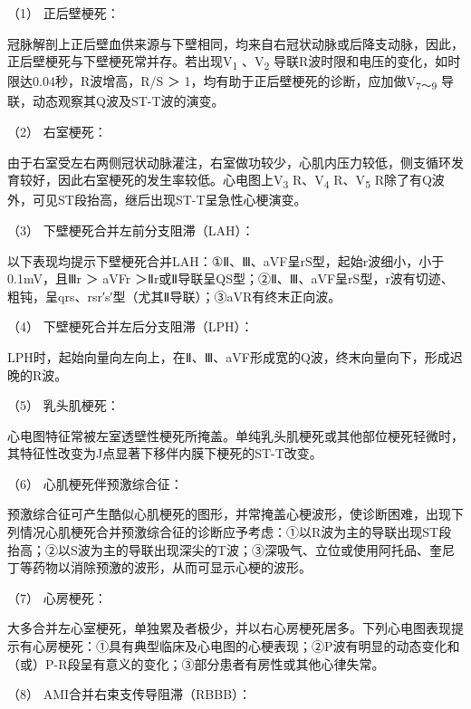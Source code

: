 \hypertarget{text00312.htmlux5cux23CHP10-8-2-2-2-1-4-1}{}
（1） 正后壁梗死：

冠脉解剖上正后壁血供来源与下壁相同，均来自右冠状动脉或后降支动脉，因此，正后壁梗死与下壁梗死常并存。若出现V\textsubscript{1}
、V\textsubscript{2}
导联R波时限和电压的变化，如时限达0.04秒，R波增高，R/S ＞
1，均有助于正后壁梗死的诊断，应加做V\textsubscript{7～9}
导联，动态观察其Q波及ST-T波的演变。

\hypertarget{text00312.htmlux5cux23CHP10-8-2-2-2-1-4-2}{}
（2） 右室梗死：

由于右室受左右两侧冠状动脉灌注，右室做功较少，心肌内压力较低，侧支循环发育较好，因此右室梗死的发生率较低。心电图上V\textsubscript{3}
R、V\textsubscript{4} R、V\textsubscript{5}
R除了有Q波外，可见ST段抬高，继后出现ST-T呈急性心梗演变。

\hypertarget{text00312.htmlux5cux23CHP10-8-2-2-2-1-4-3}{}
（3） 下壁梗死合并左前分支阻滞（LAH）：

以下表现均提示下壁梗死合并LAH：①Ⅱ、Ⅲ、aVF呈rS型，起始r波细小，小于0.1mV，且Ⅲr
＞ aVFr
＞Ⅱr或Ⅱ导联呈QS型；②Ⅱ、Ⅲ、aVF呈rS型，r波有切迹、粗钝，呈qrs、rsr′s′型（尤其Ⅱ导联）；③aVR有终末正向波。

\hypertarget{text00312.htmlux5cux23CHP10-8-2-2-2-1-4-4}{}
（4） 下壁梗死合并左后分支阻滞（LPH）：

LPH时，起始向量向左向上，在Ⅱ、Ⅲ、aVF形成宽的Q波，终末向量向下，形成迟晚的R波。

\hypertarget{text00312.htmlux5cux23CHP10-8-2-2-2-1-4-5}{}
（5） 乳头肌梗死：

心电图特征常被左室透壁性梗死所掩盖。单纯乳头肌梗死或其他部位梗死轻微时，其特征性改变为J点显著下移伴内膜下梗死的ST-T改变。

\hypertarget{text00312.htmlux5cux23CHP10-8-2-2-2-1-4-6}{}
（6） 心肌梗死伴预激综合征：

预激综合征可产生酷似心肌梗死的图形，并常掩盖心梗波形，使诊断困难，出现下列情况心肌梗死合并预激综合征的诊断应予考虑：①以R波为主的导联出现ST段抬高；②以S波为主的导联出现深尖的T波；③深吸气、立位或使用阿托品、奎尼丁等药物以消除预激的波形，从而可显示心梗的波形。

\hypertarget{text00312.htmlux5cux23CHP10-8-2-2-2-1-4-7}{}
（7） 心房梗死：

大多合并左心室梗死，单独累及者极少，并以右心房梗死居多。下列心电图表现提示有心房梗死：①具有典型临床及心电图的心梗表现；②P波有明显的动态变化和（或）P-R段呈有意义的变化；③部分患者有房性或其他心律失常。

\hypertarget{text00312.htmlux5cux23CHP10-8-2-2-2-1-4-8}{}
（8） AMI合并右束支传导阻滞（RBBB）：

